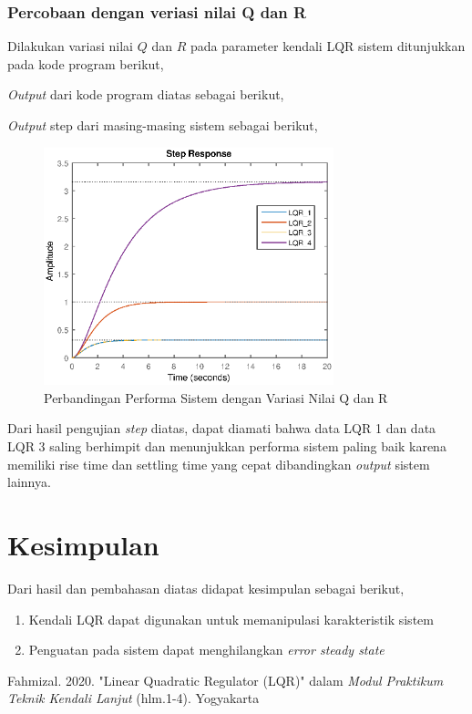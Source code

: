 \documentclass[../main.tex]{subfiles}
\begin{document}
            \subsubsection{Percobaan dengan veriasi nilai Q dan R}
                Dilakukan variasi nilai $Q$ dan $R$ pada parameter kendali LQR sistem ditunjukkan pada kode program berikut,
                
                \textit{Output} dari kode program diatas sebagai berikut,
                
                \textit{Output} step dari masing-masing sistem sebagai berikut,
                \begin{figure}[H]
                    \centering
                    \includegraphics[width = 0.75\textwidth]{assets/image/PERBANDINGAN_PERFORMA.eps}
                    \caption{Perbandingan Performa Sistem dengan Variasi Nilai Q dan R}
                    \label{perbandingan_performa}
                \end{figure}
                Dari hasil pengujian \textit{step} diatas, dapat diamati bahwa data LQR 1 dan data LQR 3 saling berhimpit dan menunjukkan performa sistem paling baik karena memiliki rise time dan settling time yang cepat dibandingkan \textit{output} sistem lainnya.
   \section{Kesimpulan}
        Dari hasil dan pembahasan diatas didapat kesimpulan sebagai berikut,
        \begin{enumerate}
            \item Kendali LQR dapat digunakan untuk memanipulasi karakteristik sistem
            \item Penguatan pada sistem dapat menghilangkan \textit{error steady state}
        \end{enumerate}
    \begin{thebibliography}{1}
         Fahmizal. 2020. "Linear Quadratic Regulator (LQR)" dalam \textit{Modul Praktikum Teknik Kendali Lanjut} (hlm.1-4). Yogyakarta
    \end{thebibliography}
\end{document}
